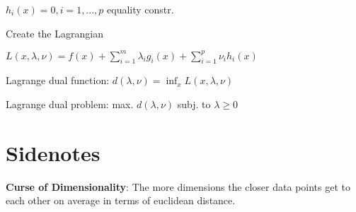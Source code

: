 \documentclass[a4paper,11pt,twocolumn]{article}
\begin{document}
$h_i(x) = 0, i = 1,...,p$ equality constr.

Create the Lagrangian

$L(x, \lambda, \nu) = f(x) + \sum_{i=1}^m{\lambda_i g_i(x) + \sum_{i=1}^p{\nu_i h_i(x)}}$

Lagrange dual function: $ d(\lambda, \nu) = \inf_{x} L (x,\lambda, \nu) $

Lagrange dual problem: max. $d(\lambda, \nu)$  subj. to $\lambda \geq 0$

\section{Sidenotes}

\textbf{Curse of Dimensionality}: The more dimensions the closer data points get to each other on average in terms of euclidean distance.
\end{document}
